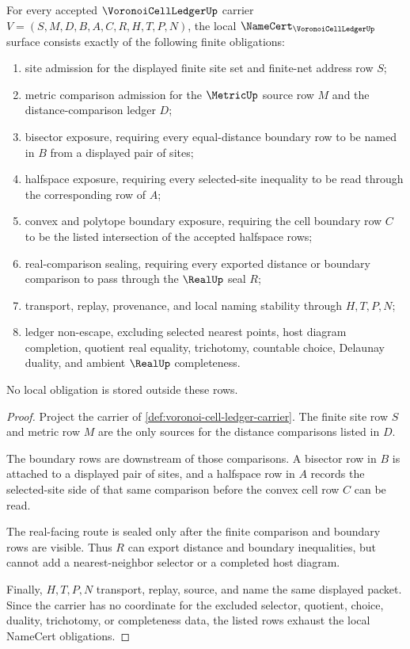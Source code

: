 \begin{theorem}
\label{thm:voronoi-cell-ledger-namecert-obligations}
For every accepted $\VoronoiCellLedgerUp$ carrier $V=(S,M,D,B,A,C,R,H,T,P,N)$, the local $\NameCert_{\VoronoiCellLedgerUp}$ surface consists exactly of the following finite obligations:
\begin{enumerate}
\item site admission for the displayed finite site set and finite-net address row $S$;
\item metric comparison admission for the $\MetricUp$ source row $M$ and the distance-comparison ledger $D$;
\item bisector exposure, requiring every equal-distance boundary row to be named in $B$ from a displayed pair of sites;
\item halfspace exposure, requiring every selected-site inequality to be read through the corresponding row of $A$;
\item convex and polytope boundary exposure, requiring the cell boundary row $C$ to be the listed intersection of the accepted halfspace rows;
\item real-comparison sealing, requiring every exported distance or boundary comparison to pass through the $\RealUp$ seal $R$;
\item transport, replay, provenance, and local naming stability through $H,T,P,N$;
\item ledger non-escape, excluding selected nearest points, host diagram completion, quotient real equality, trichotomy, countable choice, Delaunay duality, and ambient $\RealUp$ completeness.
\end{enumerate}
No local obligation is stored outside these rows.
\end{theorem}
\begin{proof}
Project the carrier of \autoref{def:voronoi-cell-ledger-carrier}. The finite site row $S$ and metric row $M$ are the only sources for the distance comparisons listed in $D$.

The boundary rows are downstream of those comparisons. A bisector row in $B$ is attached to a displayed pair of sites, and a halfspace row in $A$ records the selected-site side of that same comparison before the convex cell row $C$ can be read.

The real-facing route is sealed only after the finite comparison and boundary rows are visible. Thus $R$ can export distance and boundary inequalities, but cannot add a nearest-neighbor selector or a completed host diagram.

Finally, $H,T,P,N$ transport, replay, source, and name the same displayed packet. Since the carrier has no coordinate for the excluded selector, quotient, choice, duality, trichotomy, or completeness data, the listed rows exhaust the local NameCert obligations.
\end{proof}

